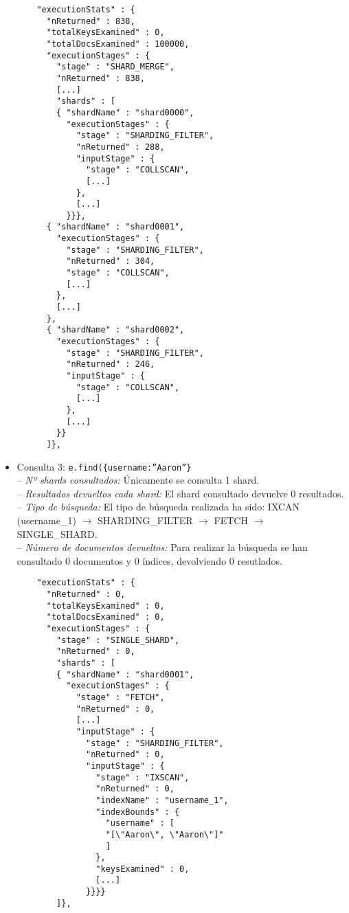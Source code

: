 \documentclass[11pt,a4paper]{article}
\begin{document}
\begin{itemize}
  \begin{lstlisting}
    "executionStats" : {
      "nReturned" : 838,
      "totalKeysExamined" : 0,
      "totalDocsExamined" : 100000,
      "executionStages" : {
        "stage" : "SHARD_MERGE",
        "nReturned" : 838,
        [...]
        "shards" : [
        { "shardName" : "shard0000",
          "executionStages" : {
            "stage" : "SHARDING_FILTER",
            "nReturned" : 288,
            "inputStage" : {
              "stage" : "COLLSCAN",
              [...]
            },
            [...]
          }}},
      { "shardName" : "shard0001",
        "executionStages" : {
          "stage" : "SHARDING_FILTER",
          "nReturned" : 304,
          "stage" : "COLLSCAN",
          [...]
        },
        [...]
      },
      { "shardName" : "shard0002",
        "executionStages" : {
          "stage" : "SHARDING_FILTER",
          "nReturned" : 246,
          "inputStage" : {
            "stage" : "COLLSCAN",
            [...]
          },
          [...]
        }}
      ]},
  \end{lstlisting}

\item Consulta 3: \texttt{e.find(\{username:''Aaron''\}}\\
  -- \emph{Nº shards consultados:} Únicamente se consulta 1 shard.
  \\-- \emph{Resultados devueltos cada shard:} El shard consultado devuelve
  0 resultados.
  \\-- \emph{Tipo de búsqueda:} El tipo de búsqueda realizada ha sido:
  IXCAN (username\_1) $\rightarrow$ SHARDING\_FILTER $\rightarrow$ FETCH
  $\rightarrow$ SINGLE\_SHARD.
  \\-- \emph{Número de documentos devueltos:} Para realizar la búsqueda se
  han consultado 0 documentos y 0 índices, devolviendo 0 resutlados.


  \begin{lstlisting}
    "executionStats" : {
      "nReturned" : 0,
      "totalKeysExamined" : 0,
      "totalDocsExamined" : 0,
      "executionStages" : {
        "stage" : "SINGLE_SHARD",
        "nReturned" : 0,
        "shards" : [
        { "shardName" : "shard0001",
          "executionStages" : {
            "stage" : "FETCH",
            "nReturned" : 0,
            [...]
            "inputStage" : {
              "stage" : "SHARDING_FILTER",
              "nReturned" : 0,
              "inputStage" : {
                "stage" : "IXSCAN",
                "nReturned" : 0,
                "indexName" : "username_1",
                "indexBounds" : {
                  "username" : [
                  "[\"Aaron\", \"Aaron\"]"
                  ]
                },
                "keysExamined" : 0,
                [...]
              }}}}
        ]},
  \end{lstlisting}
\end{itemize}
\end{document}
